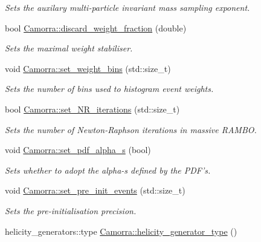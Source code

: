 \begin{DoxyCompactItemize}
\begin{DoxyCompactList}\small\item\em Sets the auxilary multi-\/particle invariant mass sampling exponent. \end{DoxyCompactList}\item 
bool \hyperlink{a00798_ab55cbcca2356be776dcae96786804880}{Camorra::discard\_\-weight\_\-fraction} (double)
\begin{DoxyCompactList}\small\item\em Sets the maximal weight stabiliser. \end{DoxyCompactList}\item 
\hypertarget{a00798_ae75318104c70ca42f203445aa86eda17}{
void \hyperlink{a00798_ae75318104c70ca42f203445aa86eda17}{Camorra::set\_\-weight\_\-bins} (std::size\_\-t)}
\label{a00798_ae75318104c70ca42f203445aa86eda17}

\begin{DoxyCompactList}\small\item\em Sets the number of bins used to histogram event weights. \end{DoxyCompactList}\item 
bool \hyperlink{a00798_a3710f88bf2e06b4efacb54c3b6617e97}{Camorra::set\_\-NR\_\-iterations} (std::size\_\-t)
\begin{DoxyCompactList}\small\item\em Sets the number of Newton-\/Raphson iterations in massive RAMBO. \end{DoxyCompactList}\item 
\hypertarget{a00798_ab077058c21d2081be27e3ccce8cb6a4b}{
void \hyperlink{a00798_ab077058c21d2081be27e3ccce8cb6a4b}{Camorra::set\_\-pdf\_\-alpha\_\-s} (bool)}
\label{a00798_ab077058c21d2081be27e3ccce8cb6a4b}

\begin{DoxyCompactList}\small\item\em Sets whether to adopt the alpha-\/s defined by the PDF's. \end{DoxyCompactList}\item 
\hypertarget{a00798_a22549e2e8a44116fa7de76c01f8f1516}{
void \hyperlink{a00798_a22549e2e8a44116fa7de76c01f8f1516}{Camorra::set\_\-pre\_\-init\_\-events} (std::size\_\-t)}
\label{a00798_a22549e2e8a44116fa7de76c01f8f1516}

\begin{DoxyCompactList}\small\item\em Sets the pre-\/initialisation precision. \end{DoxyCompactList}\item 
\hypertarget{a00798_a930109bdfb48e147a55e1b694cef846f}{
helicity\_\-generators::type \hyperlink{a00798_a930109bdfb48e147a55e1b694cef846f}{Camorra::helicity\_\-generator\_\-type} ()}
\label{a00798_a930109bdfb48e147a55e1b694cef846f}


\end{DoxyCompactItemize}
